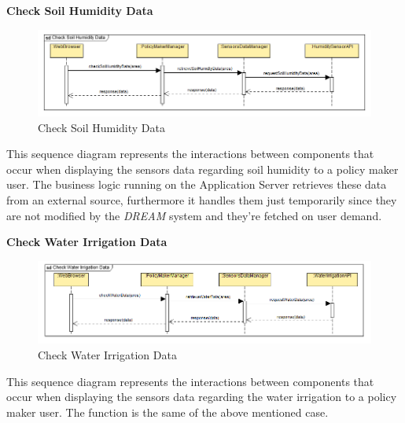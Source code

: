 \documentclass[table, 12pt]{article}
\begin{document}
\newpage
\textbf{Check Soil Humidity Data}
\begin{center}
    \begin{figure}[H]
        \includegraphics[scale=0.80, center]{assets/SequenceDiagram/CheckSoilHumidityData.png}
        \caption{Check Soil Humidity Data}
        \label{fig: humidity}
    \end{figure}
\end{center}
This sequence diagram represents the interactions between components that occur when displaying the sensors data regarding soil humidity to a policy maker user.
The business logic running on the Application Server retrieves these data from an external source, furthermore it handles them just temporarily since they are not modified by the \textit{DREAM} system and they're fetched on user demand.

\newpage
\textbf{Check Water Irrigation Data} 
\begin{center}
    \begin{figure}[H]
        \includegraphics[scale=0.80, center]{assets/SequenceDiagram/CheckWaterIrrigationData.png}
        \caption{Check Water Irrigation Data}
        \label{fig: irrigation}
    \end{figure}
\end{center}
This sequence diagram represents the interactions between components that occur when displaying the sensors data regarding the water irrigation to a policy maker user.
The function is the same of the above mentioned case.
\end{document}
